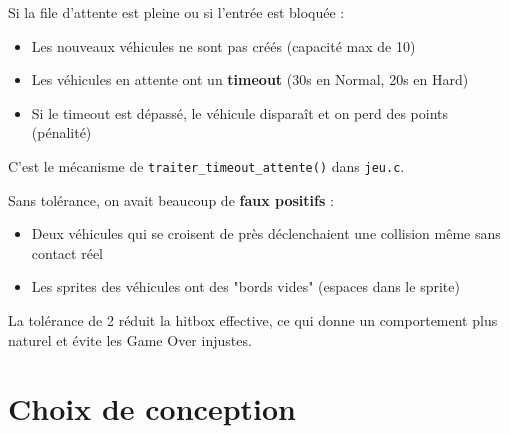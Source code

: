 \documentclass[11pt,a4paper]{article}
\newcommand{\keyword}[1]{\textcolor{primary}{\textbf{#1}}}
\newcommand{\code}[1]{\texttt{\textcolor{accent}{#1}}}
\begin{document}
\vspace{0.3cm}

\begin{questionbox}
\end{questionbox}

\begin{reponsebox}
Si la file d'attente est pleine ou si l'entrée est bloquée :
\begin{itemize}[noitemsep]
    \item Les nouveaux véhicules ne sont pas créés (capacité max de 10)
    \item Les véhicules en attente ont un \keyword{timeout} (30s en Normal, 20s en Hard)
    \item Si le timeout est dépassé, le véhicule disparaît et on perd des points (pénalité)
\end{itemize}
C'est le mécanisme de \code{traiter\_timeout\_attente()} dans \code{jeu.c}.
\end{reponsebox}

\vspace{0.3cm}

\begin{questionbox}
\end{questionbox}

\begin{reponsebox}
Sans tolérance, on avait beaucoup de \keyword{faux positifs} :
\begin{itemize}[noitemsep]
    \item Deux véhicules qui se croisent de près déclenchaient une collision même sans contact réel
    \item Les sprites des véhicules ont des "bords vides" (espaces dans le sprite)
\end{itemize}
La tolérance de 2 réduit la hitbox effective, ce qui donne un comportement plus naturel et évite les Game Over injustes.
\end{reponsebox}

\section{Choix de conception}

\begin{questionbox}
\end{questionbox}
\end{document}
